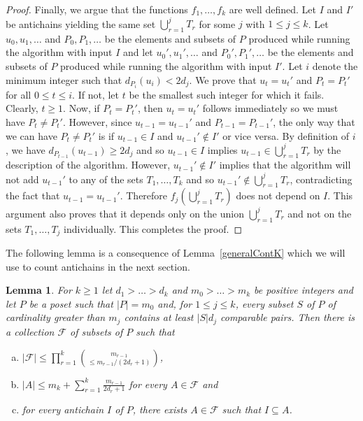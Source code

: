 \documentclass[11 pt]{article}
\newtheorem{lem}[equation]{Lemma}
\theoremstyle{definition}
\theoremstyle{case}
\numberwithin{equation}{section}
\begin{document}
\begin{proof}
Finally, we argue that the functions $f_1,\dots,f_k$ are well defined. Let $I$ and $I'$ be antichains yielding the same set $\bigcup_{r=1}^jT_r$ for some $j$ with $1\leq j\leq k$. Let $u_0,u_1,\dots$ and $P_0,P_1,\dots$ be the elements and subsets of $P$ produced while running the algorithm with input $I$ and let $u_0',u_1',\dots$ and $P_0',P_1',\dots$ be the elements and subsets of $P$ produced while running the algorithm with input $I'$. Let $i$ denote the minimum integer such that $d_{P_i}(u_i) < 2d_j$. We prove that $u_t=u_t'$ and $P_t=P_t'$ for all $0\leq t\leq i$. If not, let $t$ be the smallest such integer for which it fails. Clearly, $t\geq1$. Now, if $P_t=P_t'$, then $u_t= u_t'$ follows immediately so we must have $P_t\neq P_t'$. However, since $u_{t-1}=u_{t-1}'$ and $P_{t-1}=P_{t-1}'$, the only way that we can have $P_t\neq P_t'$ is if $u_{t-1}\in I$ and $u_{t-1}'\notin I'$ or vice versa. By definition of $i$,  we have $d_{P_{t-1}}(u_{t-1})\geq 2d_j$ and so  $u_{t-1}\in I$ implies $u_{t-1}\in \bigcup_{r=1}^jT_r$ by the description of the algorithm. However, $u_{t-1}'\notin I'$ implies that the algorithm will not add $u_{t-1}'$ to any of the sets $T_1,\dots,T_k$ and so $u_{t-1}'\notin \bigcup_{r=1}^jT_r$, contradicting the fact that $u_{t-1}=u_{t-1}'$. Therefore $f_j\left(\bigcup_{r=1}^jT_r\right)$ does not depend on $I$. This argument also proves that it depends only on the union $\bigcup_{r=1}^jT_r$ and not on the sets $T_1,\dots,T_j$ individually. This completes the proof.
\end{proof}

The following lemma is a consequence of Lemma~\ref{generalContK} which we will use to count antichains in the next section. 

\begin{lem}
\label{containersCor}
For $k\geq1$ let $d_1> \dots> d_k$ and $m_0> \dots> m_k$ be positive integers and let $P$ be a poset such that $|P|=m_0$ and, for $1\leq j\leq k$, every subset $S$ of $P$ of cardinality greater than $m_j$ contains at least $|S|d_j$ comparable pairs. Then there is a collection $\mathcal{F}$ of subsets of $P$ such that
\begin{enumerate}[(a)]
\item \label{collectionBound}$|\mathcal{F}|\leq \prod_{r=1}^k\binom{m_{r-1}}{\leq m_{r-1}/(2d_r+1)}$,
\item \label{setBound}$|A|\leq m_k + \sum_{r=1}^k\frac{m_{r-1}}{2d_r+1}$ for every $A\in\mathcal{F}$ and
\item \label{Fcontains}for every antichain $I$ of $P$, there exists $A\in \mathcal{F}$ such that $I\subseteq A$. 
\end{enumerate}
\end{lem}
\end{document}
